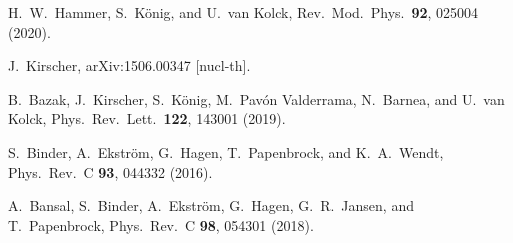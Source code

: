 \documentclass[aps,prc,reprint,superscriptaddress,nofootinbib]{revtex4-2}
\begin{document}
\begin{thebibliography}{999}
H.~W.~Hammer, S.~K\"onig, and U.~van Kolck,
Rev.\ Mod.\ Phys.\ \textbf{92}, 025004 (2020).


J.~Kirscher,
arXiv:1506.00347 [nucl-th].

B.~Bazak, J.~Kirscher, S.~K\"onig, M.~Pav\'on Valderrama, N.~Barnea, and U.~van Kolck,
Phys.\ Rev.\ Lett.\ \textbf{122}, 143001 (2019).

S.~Binder, A.~Ekstr\"om, G.~Hagen, T.~Papenbrock, and K.~A.~Wendt,
Phys.\ Rev.\ C \textbf{93}, 044332 (2016).

A.~Bansal, S.~Binder, A.~Ekstr\"om, G.~Hagen, G.~R.~Jansen, and T.~Papenbrock,
Phys.\ Rev.\ C \textbf{98}, 054301 (2018).

%


\end{thebibliography}
\end{document}
